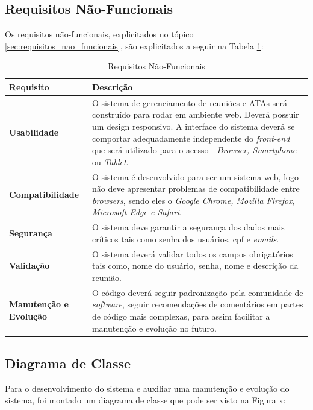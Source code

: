 \subsection{Requisitos Não-Funcionais}

Os requisitos não-funcionais, explicitados no tópico \ref{sec:requisitos_nao_funcionais}, são explicitados a seguir na Tabela \ref{tab:requisitos_nao_funcionais}:

\begin{table}[H]
	\begin{tabular}{|p{5.0cm}|p{10.0cm}|} 
	\hline
	\textbf{Requisito} & \textbf{Descrição} \\ \hline
	\textbf{Usabilidade} & O sistema de gerenciamento de reuniões e ATAs será construído para rodar em ambiente web. Deverá possuir um design responsivo. A interface do sistema deverá se comportar adequadamente independente do \textit{front-end} que será utilizado para o acesso - \textit{Browser, Smartphone} ou \textit{Tablet}. \\ \hline
	\textbf{Compatibilidade} & O sistema é desenvolvido para ser um sistema web, logo não deve apresentar problemas de compatibilidade entre \textit{browsers}, sendo eles o \textit{Google Chrome, Mozilla Firefox, Microsoft Edge e Safari}. \\ \hline
	\textbf{Segurança} & O sistema deve garantir a segurança dos dados mais críticos tais como senha dos usuários, cpf e \textit{emails}. \\ \hline
	\textbf{Validação} & O sistema deverá validar todos os campos obrigatórios tais como, nome do usuário, senha, nome e descrição da reunião. \\ \hline
	\textbf{Manutenção e Evolução} & O código deverá seguir padronização pela comunidade de \textit{software}, seguir recomendações de comentários em partes de código mais complexas, para assim facilitar a manutenção e evolução no futuro. \\ \hline
	\end{tabular}
	 \caption{Requisitos Não-Funcionais}
	 \label{tab:requisitos_nao_funcionais}
\end{table}

\subsection{Diagrama de Classe}

Para o desenvolvimento do sistema e auxiliar uma manutenção e evolução do sistema, foi montado um diagrama de classe que pode ser visto na Figura x:

